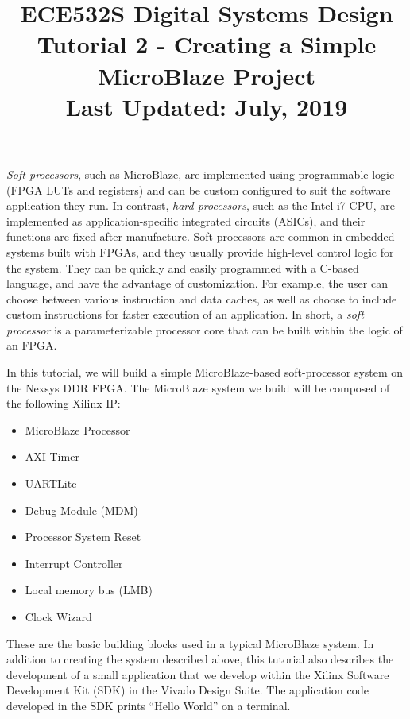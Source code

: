 \documentclass[11pt]{article}
\title{ECE532S Digital Systems Design \\ \vspace{0.4cm}
       \Large Tutorial 2 - Creating a Simple MicroBlaze Project \\ \vspace{0.4cm}
       \small Last Updated: July, 2019}
\author{ }
\date{ }
\begin{document}
\maketitle
\vspace{-1cm}

\textit{Soft processors}, such as MicroBlaze, are implemented using programmable logic (FPGA LUTs and registers) and can be custom configured to suit the software application they run. In contrast, \textit{hard processors}, such as the Intel i7 CPU, are implemented as application-specific integrated circuits (ASICs), and their functions are fixed after manufacture. Soft processors are common in embedded systems built with FPGAs, and they usually provide high-level control logic for the system. They can be quickly and easily programmed with a C-based language, and have the advantage of customization. For example, the user can choose between various instruction and data caches, as well as choose to include custom instructions for faster execution of an application. In short, a \textit{soft processor} is a parameterizable processor core that can be built within the logic of an FPGA. 

In this tutorial, we will build a simple MicroBlaze-based soft-processor system on the Nexsys DDR FPGA. The MicroBlaze system we build will be composed of the following Xilinx IP:

\begin{multicols}{2}
\begin{itemize}
    \item MicroBlaze Processor
    \item AXI Timer
    \item UARTLite
    \item Debug Module (MDM)
    \item Processor System Reset
    \item Interrupt Controller
    \item Local memory bus (LMB)
    \item Clock Wizard
\end{itemize}
\end{multicols}

\noindent
These are the basic building blocks used in a typical MicroBlaze system. In addition to creating the system described above, this tutorial also describes the development of a small application that we develop within the Xilinx Software Development Kit (SDK) in the Vivado Design Suite. The application code developed in the SDK prints “Hello World” on a terminal.
\end{document}
